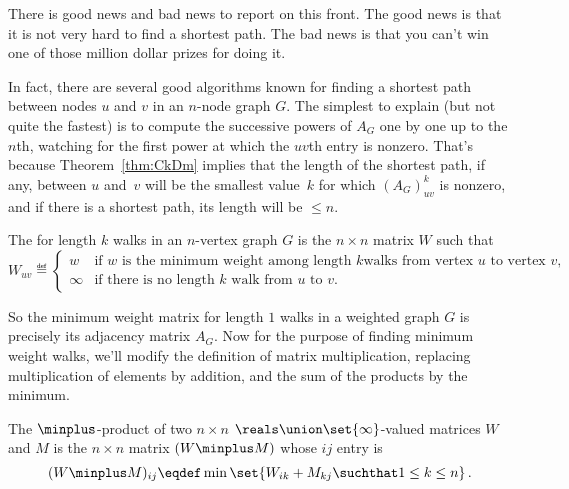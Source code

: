 \begin{editingnotes}
There is good news and bad news to report on this front.  The good
news is that it is not very hard to find a shortest path.  The bad
news is that you can't win one of those million dollar prizes for
doing it.

In fact, there are several good algorithms known for finding a shortest
path between nodes $u$ and $v$ in an $n$-node graph $G$.  The simplest to
explain (but not quite the fastest) is to compute  the successive powers of $A_G$ one by one up
to the $n$th, watching for the first power at which the $uv$th entry is
nonzero.  That's because Theorem~\ref{thm:CkDm} implies that the length of
the shortest path, if any, between $u$ and~$v$ will be the smallest
value~$k$ for which $(A_G)_{uv}^k$ is nonzero, and if there is a shortest
path, its length will be $\leq n$.
\end{editingnotes}

\begin{definition}
  The  for length $k$ walks in an $n$-vertex
  graph $G$ is the $n \times n$ matrix $W$ such that
\begin{equation}\label{def:path_matrix}
W_{uv} \eqdef
\begin{cases} w & \text{if $w$ is the minimum weight among length $k$
                            walks from vertex $u$ to vertex $v$},\\
              \infty & \text{if there is no length $k$ walk from $u$ to $v$}.
\end{cases}
\end{equation}
\end{definition}

So the minimum weight matrix for length $1$ walks in a weighted graph $G$
is precisely its adjacency matrix $A_G$.  Now for the purpose of finding
minimum weight walks, we'll modify the definition of matrix
multiplication, replacing multiplication of elements by addition, and the
sum of the products by the minimum.

\begin{definition}\label{def:minplus}
The $\minplus$-product of two $n\times n$ $\reals\union
\set{\infty}$-valued matrices $W$ and $M$ is the $n \times n$ matrix $(W\minplus M)$
whose $ij$ entry is
\[
(W\minplus M )_{ij} \eqdef \min \set{W_{ik} + M_{kj} \suchthat 1 \leq k
  \leq n}\, .
\]
\end{definition}

